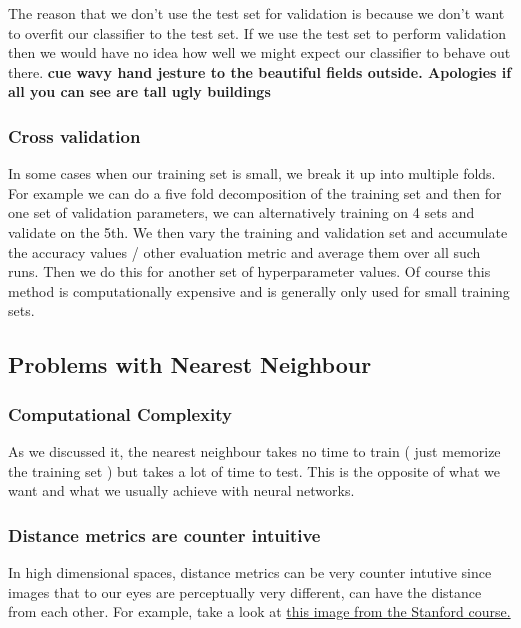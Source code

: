 \documentclass[11pt]{article}
\begin{document}
The reason that we don't use the test set for validation is because we don't want to overfit our classifier to the test set. If we use the 
test set to perform validation then we would have no idea how well we might expect our classifier to behave out there. \textbf{cue wavy hand jesture to
the beautiful fields outside. Apologies if all you can see are tall ugly buildings} 

\subsubsection{Cross validation}
\label{sec:org43ebc58}

In some cases when our training set is small, we break it up into multiple folds. For example we can do a five fold decomposition of the 
training set and then for one set of validation parameters, we can alternatively training on 4 sets and validate on the 5th. We then vary
the training and validation set and accumulate the accuracy values / other evaluation metric and average them over all such runs. 
Then we do this for another set of hyperparameter values. Of course this method is computationally expensive and is generally only used for 
small training sets.

\subsection{Problems with Nearest Neighbour}
\label{sec:org717d87e}

\subsubsection{Computational Complexity}
\label{sec:org684b254}

As we discussed it, the nearest neighbour takes no time to train ( just memorize the training set ) but takes a lot of time 
to test. This is the opposite of what we want and what we usually achieve with neural networks. 

\subsubsection{Distance metrics are counter intuitive}
\label{sec:org95aea4e}

In high dimensional spaces, distance metrics can be very counter intutive since images that to our eyes are perceptually very different, can 
have the distance from each other. For example, take a look at \href{http://cs231n.github.io/assets/samenorm.png}{this image from the Stanford course.} 
\end{document}
